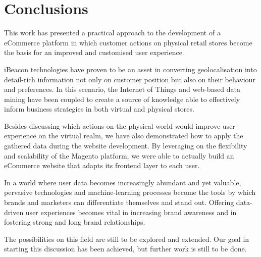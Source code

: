 \chapter*{Conclusions}

This work has presented a practical approach to the development of a eCommerce platform in which customer actions on physical retail stores become the basis for an improved and customised user experience.

iBeacon technologies have proven to be an asset in converting geolocalisation into detail-rich information not only on customer position but also on their behaviour and preferences. In this scenario, the Internet of Things and web-based data mining have been coupled to create a source of knowledge able to effectively inform business strategies in both virtual and physical stores.

Besides discussing which actions on the physical world would improve user experience on the virtual realm, we have also demonstrated how to apply the gathered data during the website development. By leveraging on the flexibility and scalability of the Magento platform, we were able to actually build an eCommerce website that adapts its frontend layer to each user.

In a world where user data becomes increasingly abundant and yet valuable, pervasive technologies and machine-learning processes become the tools by which brands and marketers can differentiate themselves and stand out. Offering data-driven user experiences becomes vital in increasing brand awareness and in fostering strong and long brand relationships.

The possibilities on this field are still to be explored and extended. Our goal in starting this discussion has been achieved, but further work is still to be done.


